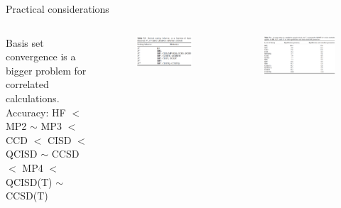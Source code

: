 \documentclass[aspectratio=169]{beamer}
\begin{document}
    \begin{frame}{Practical considerations}
        \begin{columns}
            Basis set convergence is a bigger problem for correlated calculations.\newline
            \newline
            Accuracy: HF $<$ MP2 $\sim$ MP3 $<$ CCD $<$ CISD $<$ QCISD $\sim$ CCSD $<$ MP4 $<$ QCISD(T) $\sim$ CCSD(T)\cite{foresmanExploringChemistryElectronic1996}
            \begin{figure}
                \centering
                \includegraphics[width=0.9\linewidth]{lectures/figures/3_scaling.png}
            \end{figure}
            \begin{figure}
                \centering
                \includegraphics[width=\linewidth]{lectures/figures/3_correlation_energies_vs_FCI.png}
            \end{figure}
        \end{columns}

    \end{frame}
\end{document}
